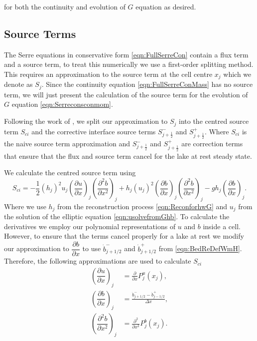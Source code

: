 for both the continuity and evolution of $G$ equation as desired.

\subsection{Source Terms}
The Serre equations in conservative form \eqref{eqn:FullSerreCon} contain a flux term and a source term, to treat this numerically we use a first-order splitting method. This requires an approximation to the source term at the cell centre $x_j$ which we denote as $S_j$. Since the continuity equation \eqref{eqn:FullSerreConMass} has no source term, we will just present the calculation of the source term for the evolution of $G$ equation \eqref{eqn:Serreconsconmom}.

Following the work of \citet{Klein-etal-2004-2050}, we split our approximation to $S_j$ into the centred source term $S_{ci}$ and the corrective interface source terms $S^{-}_{j + \frac{1}{2}}$ and $S^{+}_{j + \frac{1}{2}}$.
Where $S_{ci}$ is the naive source term approximation and $S^{-}_{j + \frac{1}{2}}$ and $S^{+}_{j + \frac{1}{2}}$ are correction terms that ensure that the flux and source term cancel for the lake at rest steady state. 

We calculate the centred source term using
\begin{equation*}
 S_{ci} = -\frac{1}{2}\left(h_j\right)^2 {u_j}\left( \frac{\partial {u}}{\partial x} \right)_j \left(\frac{\partial^2 b}{\partial x^2} \right)_j  + h_j \left(u_j\right)^2 \left(\frac{\partial b}{\partial x}\right)_j \left(\frac{\partial^2 b}{\partial x^2}\right)_j - gh_j\left(\frac{\partial b}{\partial x}\right)_j.
\end{equation*}
Where we use $h_j$ from the reconstruction process \eqref{eqn:ReconforhwG} and $u_j$ from the solution of the elliptic equation \eqref{eqn:usolvefromGhb}. To calculate the derivatives we employ our polynomial representations of $u$ and $b$ inside a cell. However, to ensure that the terms cancel properly for a lake at rest we modify our approximation to $\dfrac{\partial b}{\partial x}$ to use $\dot{b}^-_{j+1/2}$ and $\dot{b}^+_{j+1/2}$ from \eqref{eqn:BedReDefWmH}. Therefore, the following approximations are used to calculate $S_{ci}$
\begin{subequations}
	\begin{align}
	\left(\dfrac{\partial {u}}{\partial x} \right)_{j} &= \frac{\partial }{\partial x}P^u_j(x_{j}),  \\
\left(\dfrac{\partial {b}}{\partial x} \right)_{j} &=  \frac{\dot{b}^-_{j+1/2} - \dot{b}^+_{j-1/2}}{\Delta x} , \\	
	\left(\dfrac{\partial^2 {b}}{\partial x^2} \right)_{j} &= \frac{\partial^2 }{\partial x^2}P^b_j(x_{j}).
	\end{align}
	\label{eqn:dbduReconSource}
\end{subequations}

